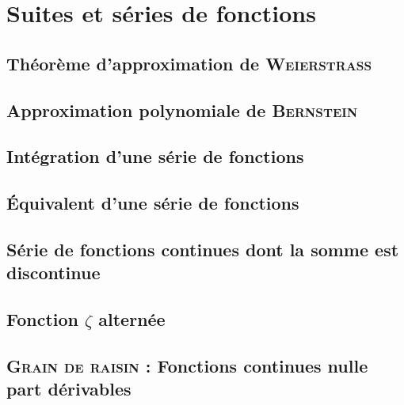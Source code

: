 \chapter{Suites et séries de fonctions}



\newpage

\section{Théorème d'approximation de \textsc{Weierstrass}}


\section{Approximation polynomiale de \textsc{Bernstein}}


\section{Intégration d'une série de fonctions}


\section{Équivalent d'une série de fonctions}


\section{Série de fonctions continues dont la somme est discontinue}


\section{Fonction \texorpdfstring{$\zeta$}{zêta} alternée}


\section{\textsc{Grain de raisin} : Fonctions continues nulle part dérivables}
% 
